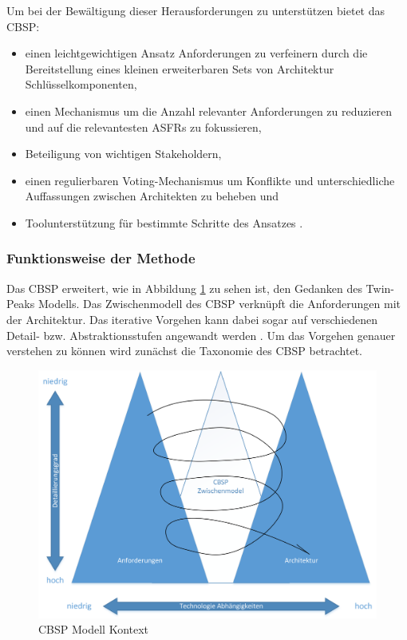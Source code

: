 Um bei der Bew\"altigung dieser Herausforderungen zu unterst\"utzen bietet das CBSP: \\

\begin{itemize}
\item einen leichtgewichtigen Ansatz Anforderungen zu verfeinern durch die Bereitstellung eines kleinen erweiterbaren Sets von Architektur Schl\"usselkomponenten, 
\item einen Mechanismus um die Anzahl relevanter Anforderungen zu reduzieren und auf die relevantesten ASFRs zu fokussieren, 
\item Beteiligung von wichtigen Stakeholdern, 
\item einen regulierbaren Voting-Mechanismus um Konflikte und unterschiedliche Auffassungen zwischen Architekten zu beheben und
\item Toolunterst\"utzung f\"ur bestimmte Schritte des Ansatzes \cite{Gru01}. \\
\end{itemize}

\subsubsection{Funktionsweise der Methode}

Das CBSP erweitert, wie in Abbildung \ref{fig_cbsp_model} zu sehen ist, den Gedanken des Twin-Peaks Modells. Das Zwischenmodell des CBSP verkn\"upft die Anforderungen mit der Architektur. Das iterative Vorgehen kann dabei sogar auf verschiedenen Detail- bzw. Abstraktionsstufen angewandt werden \cite{Gru01}. 
Um das Vorgehen genauer verstehen zu k\"onnen wird zun\"achst die Taxonomie des CBSP betrachtet. \\

\begin{figure}[h]
	\centering
	\includegraphics[scale=0.5]{cbsp_model2.png} 
	\caption{CBSP Modell Kontext \cite{Gru01}}
	\label{fig_cbsp_model}
\end{figure}

